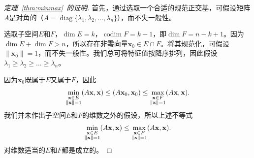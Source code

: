 \begin{proof}[定理~\ref{thm:minmax}~的证明]
  首先，通过选取一个合适的规范正交基，可假设矩阵$A$是对角的（$A=\operatorname{diag}\{\lambda_1,\lambda_2,\dots,\lambda_n\}$），而不失一般性。

  选取子空间$E$和$F$，$\dim E=k$，$\operatorname{codim}F=k-1$，即$\dim F=n-k+1$。因为$\dim E+\dim F>n$，所以存在非零向量$\mathbf{x}_0\in E\cap F$。将其规范化，可假设$\|\mathbf{x}_0\|=1$，而不失一般性。我们总可将特征值按降序排列，因此假设$\lambda_{1}\geq\lambda_{2}\geq\ldots\geq\lambda_{n}$。

  因为$\mathbf{x}_0$既属于$E$又属于$F$，因此
  \[\min_{\begin{subarray}{c}\mathbf{x}\in E\\\|\mathbf{x}\|=1\end{subarray}}(A\mathbf{x},\mathbf{x})\leq(A\mathbf{x}_0,\mathbf{x}_0)\leq\max_{\begin{subarray}{c}\mathbf{x}\in F\\\|\mathbf{x}\|=1\end{subarray}}(A\mathbf{x},\mathbf{x}).\]
  我们并未作出子空间$E$和$F$的维数之外的假设，所以上述不等式
  \begin{equation}\label{mine_maxf}
    \min_{\begin{subarray}{c}\mathbf{x}\in E\\\|\mathbf{x}\|=1\end{subarray}}(A\mathbf{x},\mathbf{x})\leq\max_{\begin{subarray}{c}\mathbf{x}\in F\\\|\mathbf{x}\|=1\end{subarray}}(A\mathbf{x},\mathbf{x}).
  \end{equation}
  对维数适当的$E$和$F$都是成立的。


\end{proof}
